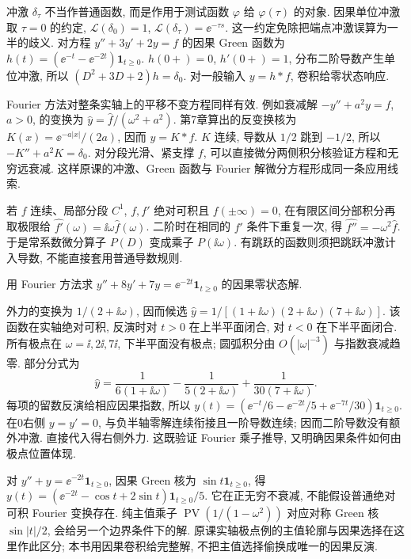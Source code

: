 冲激 $\delta_\tau$ 不当作普通函数, 而是作用于测试函数 $\varphi$ 给 $\varphi(\tau)$ 的对象. 因果单位冲激取 $\tau=0$ 的约定, $\mathcal L(\delta_0)=1$, $\mathcal L(\delta_\tau)=\ee^{-\tau s}$. 这一约定免除把端点冲激误算为一半的歧义. 对方程 $y''+3y'+2y=f$ 的因果 Green 函数为 $h(t)=(\ee^{-t}-\ee^{-2t})\mathbf1_{t\ge0}$. $h(0+)=0$, $h'(0+)=1$, 分布二阶导数产生单位冲激, 所以 $(D^2+3D+2)h=\delta_0$. 对一般输入 $y=h*f$, 卷积给零状态响应.

Fourier 方法对整条实轴上的平移不变方程同样有效. 例如衰减解 $-y''+a^2y=f$, $a>0$, 的变换为 $\widehat y=\widehat f/(\omega^2+a^2)$. 第7章算出的反变换核为 $K(x)=\ee^{-a|x|}/(2a)$, 因而 $y=K*f$. $K$ 连续, 导数从 $1/2$ 跳到 $-1/2$, 所以 $-K''+a^2K=\delta_0$. 对分段光滑、紧支撑 $f$, 可以直接微分两侧积分核验证方程和无穷远衰减. 这样原课的冲激、Green 函数与 Fourier 解微分方程形成同一条应用线索.

若 $f$ 连续、局部分段 $C^1$, $f,f'$ 绝对可积且 $f(\pm\infty)=0$, 在有限区间分部积分再取极限给 $\widehat{f'}(\omega)=\ii\omega\widehat f(\omega)$. 二阶时在相同的 $f'$ 条件下重复一次, 得 $\widehat{f''}=-\omega^2\widehat f$. 于是常系数微分算子 $P(D)$ 变成乘子 $P(\ii\omega)$. 有跳跃的函数则须把跳跃冲激计入导数, 不能直接套用普通导数规则.
\begin{example}
用 Fourier 方法求 $y''+8y'+7y=\ee^{-2t}\mathbf1_{t\ge0}$ 的因果零状态解.
\end{example}
\begin{solution}
外力的变换为 $1/(2+\ii\omega)$, 因而候选 $\widehat y=1/[(1+\ii\omega)(2+\ii\omega)(7+\ii\omega)]$. 该函数在实轴绝对可积, 反演时对 $t>0$ 在上半平面闭合, 对 $t<0$ 在下半平面闭合. 所有极点在 $\omega=\ii,2\ii,7\ii$, 下半平面没有极点; 圆弧积分由 $O(|\omega|^{-3})$ 与指数衰减趋零. 部分分式为
\[
\widehat y=\frac1{6(1+\ii\omega)}-\frac1{5(2+\ii\omega)}
 +\frac1{30(7+\ii\omega)}.
\]
每项的留数反演给相应因果指数, 所以 $y(t)=(\ee^{-t}/6-\ee^{-2t}/5+\ee^{-7t}/30)\mathbf1_{t\ge0}$. 在0右侧 $y=y'=0$, 与负半轴零解连续衔接且一阶导数连续; 因而二阶导数没有额外冲激. 直接代入得右侧外力. 这既验证 Fourier 乘子推导, 又明确因果条件如何由极点位置体现.
\end{solution}
对 $y''+y=\ee^{-2t}\mathbf1_{t\ge0}$, 因果 Green 核为 $\sin t\mathbf1_{t\ge0}$, 得 $y(t)=(\ee^{-2t}-\cos t+2\sin t)\mathbf1_{t\ge0}/5$. 它在正无穷不衰减, 不能假设普通绝对可积 Fourier 变换存在. 纯主值乘子 $\operatorname{PV}(1/(1-\omega^2))$ 对应对称 Green 核 $\sin|t|/2$, 会给另一个边界条件下的解. 原课实轴极点例的主值轮廓与因果选择在这里作此区分; 本书用因果卷积给完整解, 不把主值选择偷换成唯一的因果反演.

